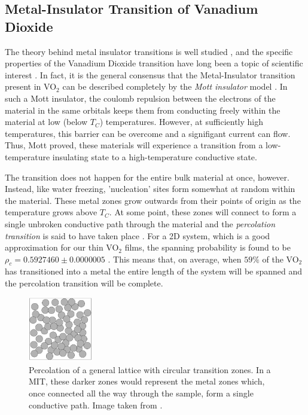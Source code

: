 \documentclass[%
 reprint,
 amsmath,amssymb,
 aps,
 pra,
]{revtex4-1}
\begin{document}
\subsection{Metal-Insulator Transition of Vanadium Dioxide}

The theory behind metal insulator transitions is well studied \cite{phase_2}, and the specific properties of the Vanadium Dioxide transition have long been a topic of scientific interest \cite{manual, vo2_1, vo2_2}. In fact, it is the general consensus that the Metal-Insulator transition present in VO$_2$ can be described completely by the \textit{Mott insulator} model \cite{manual}. In such a Mott insulator, the coulomb repulsion between the electrons of the material in the same orbitals keeps them from conducting freely within the material at low (below $T_C$) temperatures. However, at sufficiently high temperatures, this barrier can be overcome and a signifigant current can flow. Thus, Mott proved, these materials will experience a transition from a low-temperature insulating state to a high-temperature conductive state.

The transition does not happen for the entire bulk material at once, however. Instead, like water freezing, 'nucleation' sites form somewhat at random within the material. These metal zones grow outwards from their points of origin as the temperature grows above $T_C$. At some point, these zones will connect to form a single unbroken conductive path through the material and the \textit{percolation transition} is said to have taken place \cite{perc}. For a 2D system, which is a good approximation for our thin VO$_2$ films, the spanning probability is found to be $\rho_c = 0.592 7460 \pm 0.000 0005 $ \cite{perc,perc2}. This means that, on average, when $59\%$ of the VO$_2$ has transitioned into a metal the entire length of the system will be spanned and the percolation transition will be complete.

\begin{figure}[H]
	\centering
	\includegraphics[width=0.25\textwidth]{percolation.png}
	\caption{Percolation of a general lattice with circular transition zones. In a MIT, these darker zones would represent the metal zones which, once connected all the way through the sample, form a single conductive path. Image taken from \cite{perc}.}
	\label{fig:perc}
\end{figure}
\end{document}
